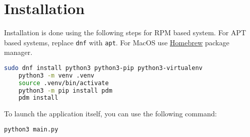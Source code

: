 \section{Installation}

Installation is done using the following steps for RPM based system. For APT based systems, replace \texttt{dnf} with \texttt{apt}. 
For MacOS use \href{https://brew.sh/}{Homebrew} package manager.
\begin{lstlisting}[language=bash]
    sudo dnf install python3 python3-pip python3-virtualenv
    python3 -m venv .venv
    source .venv/bin/activate
    python3 -m pip install pdm
    pdm install
\end{lstlisting}

To launch the application itself, you can use the following command:
\begin{lstlisting}[language=bash]
    python3 main.py
\end{lstlisting}
